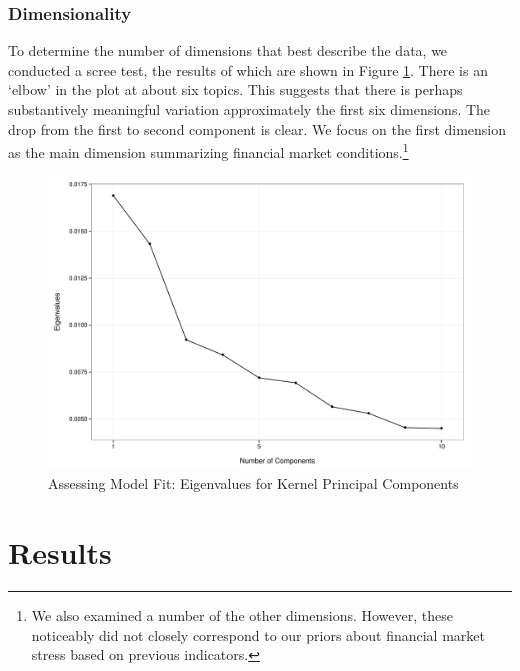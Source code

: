 \documentclass[]{article}
\begin{document}
\subsubsection{Dimensionality}\label{dimensionality}

To determine the number of dimensions that best describe the data, we
conducted a scree test, the results of which are shown in Figure
\ref{scree_plot}. There is an `elbow' in the plot at about six topics.
This suggests that there is perhaps substantively meaningful variation
approximately the first six dimensions. The drop from the first to
second component is clear. We focus on the first dimension as the main
dimension summarizing financial market conditions.\footnote{We also
  examined a number of the other dimensions. However, these noticeably
  did not closely correspond to our priors about financial market stress
  based on previous indicators.}

\begin{figure}
    \caption{Assessing Model Fit: Eigenvalues for Kernel Principal Components}
    \label{scree_plot}
    \begin{center}
        \includegraphics[scale=0.5]{analysis/figures/scree_plot.pdf}
    \end{center}
\end{figure}

\section{Results}\label{results}
\end{document}
